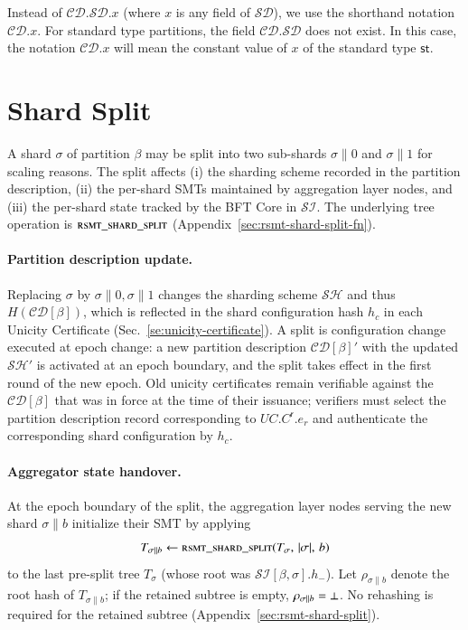 Instead of $\mathcal{CD}.\mathcal{SD}.x$ (where $x$ is any field of $\mathcal{SD}$), we use the shorthand notation $\mathcal{CD}.x$.
For standard type partitions, the field $\mathcal{CD}.\mathcal{SD}$ does not exist. In this case, the notation $\mathcal{CD}.x$ will mean the constant value of $x$ of the standard type $\mathsf{st}$.

\section{Shard Split}\label{sec:shard-split-lifecycle}

A shard $\sigma$ of partition $\beta$ may be split into two sub-shards $\sigma \| 0$ and $\sigma \| 1$ for scaling reasons. The split affects (i) the sharding scheme recorded in the partition description, (ii) the per-shard SMTs maintained by aggregation layer nodes, and (iii) the per-shard state tracked by the BFT Core in $\mathcal{SI}$. The underlying tree operation is $\textsc{rsmt\_shard\_split}$ (Appendix~\ref{sec:rsmt-shard-split-fn}).

\paragraph{Partition description update.} Replacing $\sigma$ by $\sigma\|0,\sigma\|1$ changes the sharding scheme $\mathcal{SH}$ and thus $H(\mathcal{CD}[\beta])$, which is reflected in the shard configuration hash $h_c$ in each Unicity Certificate (Sec.~\ref{se:unicity-certificate}). A split is configuration change executed at epoch change: a new partition description $\mathcal{CD}[\beta]'$ with the updated $\mathcal{SH}'$ is activated at an epoch boundary, and the split takes effect in the first round of the new epoch. Old unicity certificates remain verifiable against the $\mathcal{CD}[\beta]$ that was in force at the time of their issuance; verifiers must select the partition description record corresponding to $UC.C^\mathsf{r}.e_r$ and authenticate the corresponding shard configuration by $h_c$.

\paragraph{Aggregator state handover.} At the epoch boundary of the split, the aggregation layer nodes serving the new shard $\sigma\|b$ initialize their SMT by applying
\[
T_{\sigma\|b} \gets \textsc{rsmt\_shard\_split}(T_\sigma,\, |\sigma|,\, b)
\]
to the last pre-split tree $T_\sigma$ (whose root was $\mathcal{SI}[\beta,\sigma].h_-$). Let $\rho_{\sigma\|b}$ denote the root hash of $T_{\sigma\|b}$; if the retained subtree is empty, $\rho_{\sigma\|b} = \bot$. No rehashing is required for the retained subtree (Appendix~\ref{sec:rsmt-shard-split}).

